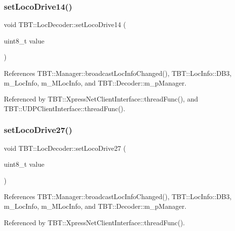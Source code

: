 \subsubsection{\texorpdfstring{set\+Loco\+Drive14()}{setLocoDrive14()}}
{\footnotesize\ttfamily void T\+B\+T\+::\+Loc\+Decoder\+::set\+Loco\+Drive14 (\begin{DoxyParamCaption}\item[{uint8\+\_\+t}]{value }\end{DoxyParamCaption})\hspace{0.3cm}{\ttfamily [inline]}}



References T\+B\+T\+::\+Manager\+::broadcast\+Loc\+Info\+Changed(), T\+B\+T\+::\+Loc\+Info\+::\+D\+B3, m\+\_\+\+Loc\+Info, m\+\_\+\+M\+Loc\+Info, and T\+B\+T\+::\+Decoder\+::m\+\_\+p\+Manager.



Referenced by T\+B\+T\+::\+Xpress\+Net\+Client\+Interface\+::thread\+Func(), and T\+B\+T\+::\+U\+D\+P\+Client\+Interface\+::thread\+Func().

\mbox{\label{classTBT_1_1LocDecoder_ace59dd8679514643328ce916057669e4_ace59dd8679514643328ce916057669e4}} 
\subsubsection{\texorpdfstring{set\+Loco\+Drive27()}{setLocoDrive27()}}
{\footnotesize\ttfamily void T\+B\+T\+::\+Loc\+Decoder\+::set\+Loco\+Drive27 (\begin{DoxyParamCaption}\item[{uint8\+\_\+t}]{value }\end{DoxyParamCaption})\hspace{0.3cm}{\ttfamily [inline]}}



References T\+B\+T\+::\+Manager\+::broadcast\+Loc\+Info\+Changed(), T\+B\+T\+::\+Loc\+Info\+::\+D\+B3, m\+\_\+\+Loc\+Info, m\+\_\+\+M\+Loc\+Info, and T\+B\+T\+::\+Decoder\+::m\+\_\+p\+Manager.



Referenced by T\+B\+T\+::\+Xpress\+Net\+Client\+Interface\+::thread\+Func().

\mbox{\label{classTBT_1_1LocDecoder_a6bbf6c173217c49b7d4909b9c4cb5127_a6bbf6c173217c49b7d4909b9c4cb5127}} 
